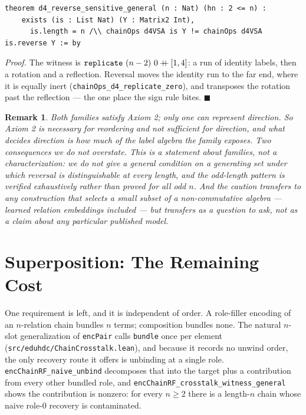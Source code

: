 \documentclass[10pt]{article}
\newtheorem{remark}[theorem]{Remark}
\begin{document}
\begin{lstlisting}
theorem d4_reverse_sensitive_general (n : Nat) (hn : 2 <= n) :
    exists (is : List Nat) (Y : Matrix2 Int),
      is.length = n /\\ chainOps d4VSA is Y != chainOps d4VSA is.reverse Y := by
\end{lstlisting}

\emph{Proof.} The witness is $\texttt{replicate}\ (n-2)\ 0 \mathbin{+\mkern-8mu+} [1,4]$: a run of identity labels, then a rotation and a reflection. Reversal moves the identity run to the far end, where it is equally inert (\texttt{chainOps\_d4\_replicate\_zero}), and transposes the rotation past the reflection --- the one place the sign rule bites. $\blacksquare$

\begin{remark}
\label{rem:coverage}
Both families satisfy Axiom 2; only one can represent direction. So Axiom 2 is necessary for reordering and \emph{not sufficient} for direction, and what decides direction is how much of the label algebra the family exposes. Two consequences we do not overstate. This is a statement about families, not a characterization: we do not give a general condition on a generating set under which reversal is distinguishable at every length, and the odd-length pattern is verified exhaustively rather than proved for all odd $n$. And the caution transfers to any construction that selects a small subset of a non-commutative algebra --- learned relation embeddings included --- but transfers as a question to ask, not as a claim about any particular published model.
\end{remark}

\section{Superposition: The Remaining Cost}
\label{sec:superposition}

One requirement is left, and it is independent of order. A role-filler encoding of an $n$-relation chain bundles $n$ terms; composition bundles none. The natural $n$-slot generalization of \texttt{encPair} calls \texttt{bundle} once per element (\texttt{src/eduhdc/\allowbreak ChainCrosstalk.lean}), and because it records no unwind order, the only recovery route it offers is unbinding at a single role. \texttt{encChainRF\_naive\_unbind} decomposes that into the target plus a contribution from every other bundled role, and \texttt{encChainRF\_crosstalk\_witness\_general} shows the contribution is nonzero: for every $n \geq 2$ there is a length-$n$ chain whose naive role-0 recovery is contaminated.
\end{document}
